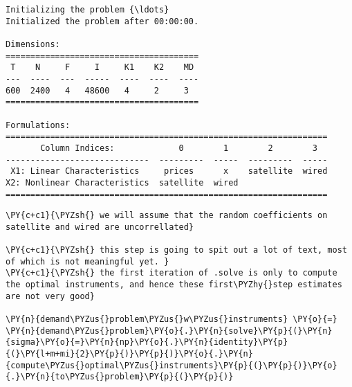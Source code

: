     \begin{Verbatim}[commandchars=\\\{\}]
Initializing the problem {\ldots}
Initialized the problem after 00:00:00.

Dimensions:
=======================================
 T    N     F     I     K1    K2    MD
---  ----  ---  -----  ----  ----  ----
600  2400   4   48600   4     2     3
=======================================

Formulations:
=================================================================
       Column Indices:             0        1        2        3
-----------------------------  ---------  -----  ---------  -----
 X1: Linear Characteristics     prices      x    satellite  wired
X2: Nonlinear Characteristics  satellite  wired
=================================================================
    \end{Verbatim}

    \begin{tcolorbox}[breakable, size=fbox, boxrule=1pt, pad at break*=1mm,colback=cellbackground, colframe=cellborder]
\begin{Verbatim}[commandchars=\\\{\}]
\PY{c+c1}{\PYZsh{} we will assume that the random coefficients on satellite and wired are uncorrellated}

\PY{c+c1}{\PYZsh{} this step is going to spit out a lot of text, most of which is not meaningful yet. }
\PY{c+c1}{\PYZsh{} the first iteration of .solve is only to compute the optimal instruments, and hence these first\PYZhy{}step estimates are not very good}

\PY{n}{demand\PYZus{}problem\PYZus{}w\PYZus{}instruments} \PY{o}{=} \PY{n}{demand\PYZus{}problem}\PY{o}{.}\PY{n}{solve}\PY{p}{(}\PY{n}{sigma}\PY{o}{=}\PY{n}{np}\PY{o}{.}\PY{n}{identity}\PY{p}{(}\PY{l+m+mi}{2}\PY{p}{)}\PY{p}{)}\PY{o}{.}\PY{n}{compute\PYZus{}optimal\PYZus{}instruments}\PY{p}{(}\PY{p}{)}\PY{o}{.}\PY{n}{to\PYZus{}problem}\PY{p}{(}\PY{p}{)}
\end{Verbatim}
\end{tcolorbox}

